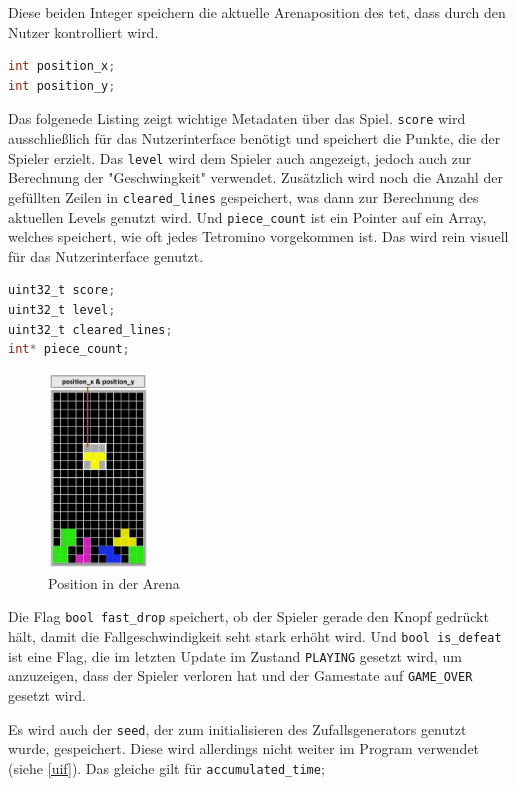 \documentclass[11pt]{article}
\newcommand{\lstin}[1]{\lstinline[language=C]{#1}}
\begin{document}
Diese beiden Integer speichern die aktuelle Arenaposition des \gls{tet}, dass durch den Nutzer kontrolliert wird.
\begin{lstlisting}[language=C]
int position_x;
int position_y;
\end{lstlisting}

Das folgenede Listing zeigt wichtige Metadaten über das Spiel. \lstin{score} wird ausschließlich für das Nutzerinterface benötigt und speichert die Punkte, die der Spieler erzielt.
Das \lstin{level} wird dem Spieler auch angezeigt, jedoch auch zur Berechnung der "Geschwingkeit" verwendet. 
Zusätzlich wird noch die Anzahl der gefüllten Zeilen in \lstin{cleared_lines} gespeichert, was dann zur Berechnung des aktuellen Levels genutzt wird.
Und \lstin{piece_count} ist ein Pointer auf ein Array, welches speichert, wie oft jedes Tetromino vorgekommen ist. Das wird rein visuell für das Nutzerinterface genutzt.

\begin{lstlisting}[language=C]
uint32_t score;
uint32_t level;
uint32_t cleared_lines;
int* piece_count;
\end{lstlisting}

\begin{figure}
  \includegraphics[width=100px]{../images/position.jpg}
  \caption{Position in der Arena}
\end{figure}

Die Flag \lstin{bool fast_drop} speichert, ob der Spieler gerade den Knopf gedrückt hält, damit die Fallgeschwindigkeit seht stark erhöht wird.
Und \lstin{bool is_defeat} ist eine Flag, die im letzten Update im Zustand \lstin{PLAYING} gesetzt wird, um anzuzeigen, dass der Spieler verloren hat und der Gamestate auf \lstin{GAME_OVER} gesetzt wird.

Es wird auch der \lstin{seed}, der zum initialisieren des Zufallsgenerators genutzt wurde, gespeichert. Diese wird allerdings nicht weiter im Program verwendet (siehe \ref{uif}).
Das gleiche gilt für \lstin{accumulated_time};
\end{document}
